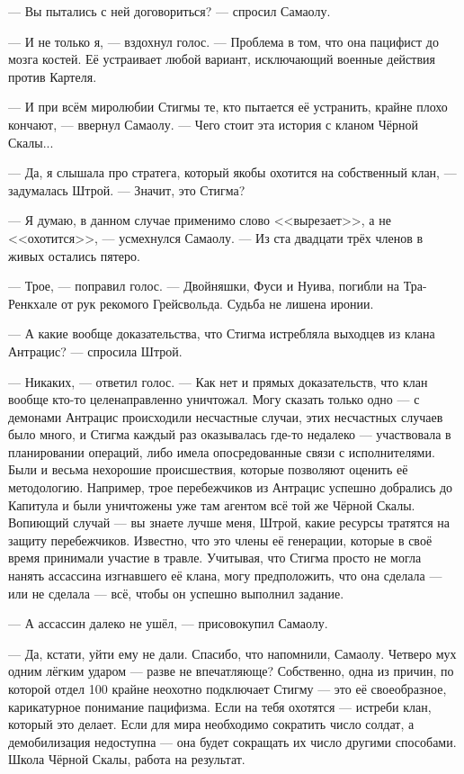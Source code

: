 --- Вы пытались с ней договориться? --- спросил Самаолу.

--- И не только я, --- вздохнул голос.
--- Проблема в том, что она пацифист до мозга костей.
Её устраивает любой вариант, исключающий военные действия против Картеля.

--- И при всём миролюбии Стигмы те, кто пытается её устранить, крайне плохо кончают, --- ввернул Самаолу.
--- Чего стоит эта история с кланом Чёрной Скалы...

--- Да, я слышала про стратега, который якобы охотится на собственный клан, --- задумалась Штрой.
--- Значит, это Стигма?

--- Я думаю, в данном случае применимо слово <<вырезает>>, а не <<охотится>>, --- усмехнулся Самаолу.
--- Из ста двадцати трёх членов в живых остались пятеро.

--- Трое, --- поправил голос.
--- Двойняшки, Фуси и Нуива, погибли на Тра-Ренкхале от рук рекомого Грейсвольда.
Судьба не лишена иронии.

--- А какие вообще доказательства, что Стигма истребляла выходцев из клана Антрацис? --- спросила Штрой.

--- Никаких, --- ответил голос.
--- Как нет и прямых доказательств, что клан вообще кто-то целенаправленно уничтожал.
Могу сказать только одно --- с демонами Антрацис происходили несчастные случаи, этих несчастных случаев было много, и Стигма каждый раз оказывалась где-то недалеко --- участвовала в планировании операций, либо имела опосредованные связи с исполнителями.
Были и весьма нехорошие происшествия, которые позволяют оценить её методологию.
Например, трое перебежчиков из Антрацис успешно добрались до Капитула и были уничтожены уже там агентом всё той же Чёрной Скалы.
Вопиющий случай --- вы знаете лучше меня, Штрой, какие ресурсы тратятся на защиту перебежчиков.
Известно, что это члены её генерации, которые в своё время принимали участие в травле.
Учитывая, что Стигма просто не могла нанять ассассина изгнавшего её клана, могу предположить, что она сделала --- или не сделала --- всё, чтобы он успешно выполнил задание.

--- А ассассин далеко не ушёл, --- присовокупил Самаолу.

--- Да, кстати, уйти ему не дали.
Спасибо, что напомнили, Самаолу.
Четверо мух одним лёгким ударом --- разве не впечатляюще?
Собственно, одна из причин, по которой отдел 100 крайне неохотно подключает Стигму --- это её своеобразное, карикатурное понимание пацифизма.
Если на тебя охотятся --- истреби клан, который это делает.
Если для мира необходимо сократить число солдат, а демобилизация недоступна --- она будет сокращать их число другими способами.
Школа Чёрной Скалы, работа на результат.

